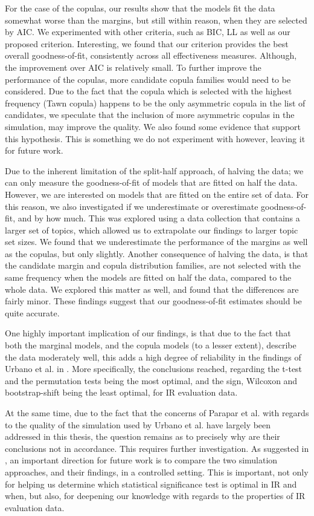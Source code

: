 For the case of the copulas, our results show that the models fit the data somewhat worse than the margins, but still within reason, when they are selected by AIC. We experimented with other criteria, such as BIC, LL as well as our proposed criterion. Interesting, we found that our criterion provides the best overall goodness-of-fit, consistently across all effectiveness measures. Although, the improvement over AIC is relatively small. To further improve the performance of the copulas, more candidate copula families would need to be considered. Due to the fact that the copula which is selected with the highest frequency (Tawn copula) happens to be the only asymmetric copula in the list of candidates, we speculate that the inclusion of more asymmetric copulas in the simulation, may improve the quality. We also found some evidence that support this hypothesis. This is something we do not experiment with however, leaving it for future work.

Due to the inherent limitation of the split-half approach, of halving the data; we can only measure the goodness-of-fit of models that are fitted on half the data. However, we are interested on models that are fitted on the entire set of data. For this reason, we also investigated if we underestimate or overestimate goodness-of-fit, and by how much. This was explored using a data collection that contains a larger set of topics, which allowed us to extrapolate our findings to larger topic set sizes. We found that we underestimate the performance of the margins as well as the copulas, but only slightly. Another consequence of halving the data, is that the candidate margin and copula distribution families, are not selected with the same frequency when the models are fitted on half the data, compared to the whole data. We explored this matter as well, and found that the differences are fairly minor. These findings suggest that our goodness-of-fit estimates should be quite accurate. 

One highly important implication of our findings, is that due to the fact that both the marginal models, and the copula models (to a lesser extent), describe the data moderately well, this adds a high degree of reliability in the findings of Urbano et al. in \cite{Urbano2019}. More specifically, the conclusions reached, regarding the t-test and the permutation tests being the most optimal, and the sign, Wilcoxon and bootstrap-shift being the least optimal, for IR evaluation data. 

At the same time, due to the fact that the concerns of Parapar et al. with regards to the quality of the simulation used by Urbano et al. have largely been addressed in this thesis, the question remains as to precisely why are their conclusions not in accordance. This requires further investigation. As suggested in \cite{Urbano2021}, an important direction for future work is to compare the two simulation approaches, and their findings, in a controlled setting. This is important, not only for helping us determine which statistical significance test is optimal in IR and when, but also, for deepening our knowledge with regards to the properties of IR evaluation data.



